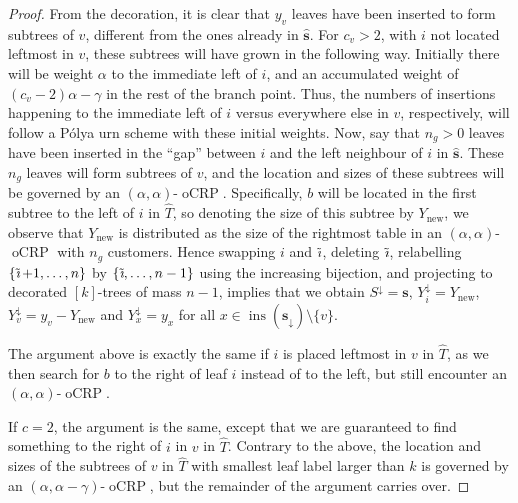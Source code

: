 \documentclass[a4paper, final]{amsart}
\theoremstyle{plain}
\theoremstyle{definition}
\newcommand{\tree}[1][t]{\boldsymbol{#1}}
\newcommand{\that}[1][t]{\hat{\boldsymbol{#1}}} %
\newcommand{\That}[1][T]{\widehat{#1}}
\DeclareMathOperator{\insertable}{ins}
\DeclareMathOperator{\tildei}{\tilde{\textit{\i}}}
\DeclareMathOperator{\ocrp}{oCRP}
\begin{document}
\begin{proof}
From the decoration, it is clear that $y_v$ leaves have been inserted to form subtrees of $v$, different from the ones already in $\that[s]$.
For $c_v > 2$, with $i$ not located leftmost in $v$, these subtrees will have grown in the following way.
Initially there will be weight $\alpha$ to the immediate left of $i$, and an accumulated weight of $(c_v-2)\alpha - \gamma$ in the rest of the branch point.
Thus, the numbers of insertions happening to the immediate left of $i$ versus everywhere else in $v$, respectively, will follow a P\'{o}lya urn scheme with these initial weights.
Now, say that $n_g > 0$ leaves have been inserted in the “gap” between $i$ and the left neighbour of $i$ in $\that[s]$.
These $n_g$ leaves will form subtrees of $v$, and the location and sizes of these subtrees will be governed by an $(\alpha, \alpha)$-$\ocrp$.
Specifically, $b$ will be located in the first subtree to the left of $i$ in $\That$, so denoting the size of this subtree by $Y_\text{new}$, we observe that $Y_\text{new}$ is distributed as the size of the rightmost table in an $(\alpha, \alpha)$-$\ocrp$ with $n_g$ customers.
Hence swapping $i$ and $\tildei$, deleting $\tildei$, relabelling $\{\tildei + 1, \ldots, n\}$ by $\{\tildei, \ldots, n-1\}$ using the increasing bijection, and projecting to decorated $[k]$-trees of mass $n-1$, implies that we obtain $S^\downarrow = \tree[s]$, $Y_i^\downarrow = Y_{\text{new}}$, $Y_v^\downarrow = y_v - Y_{\text{new}}$ and $Y_x^\downarrow = y_x$ for all $x \in \insertable \left({\tree[s]}_\downarrow \right) \setminus \{v\}$.

The argument above is exactly the same if $i$ is placed leftmost in $v$ in $\That$, as we then search for $b$ to the right of leaf $i$ instead of to the left, but still encounter an $(\alpha, \alpha)$-$\ocrp$. 

If $c = 2$, the argument is the same, except that we are guaranteed to find something to the right of $i$ in $v$ in $\That$.
Contrary to the above, the location and sizes of the subtrees  of $v$ in $\That$ with smallest leaf label larger than $k$ is governed by an $(\alpha,\alpha-\gamma)$-$\ocrp$, but the remainder of the argument carries over.


\end{proof}
\end{document}
